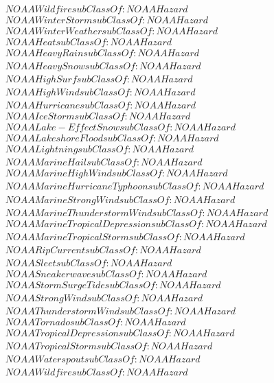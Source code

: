 \begin{align}
  NOAAWildfire subClassOf: NOAAHazard\\
  NOAAWinterStorm subClassOf: NOAAHazard\\
  NOAAWinterWeather subClassOf: NOAAHazard\\
  NOAAHeat subClassOf: NOAAHazard\\
  NOAAHeavyRain subClassOf: NOAAHazard\\
  NOAAHeavySnow subClassOf: NOAAHazard\\
  NOAAHighSurf subClassOf: NOAAHazard\\
  NOAAHighWind subClassOf: NOAAHazard\\
  NOAAHurricane subClassOf: NOAAHazard\\
  NOAAIceStorm subClassOf: NOAAHazard\\
  NOAALake-EffectSnow subClassOf: NOAAHazard\\
  NOAALakeshoreFlood subClassOf: NOAAHazard\\
  NOAALightning subClassOf: NOAAHazard\\
  NOAAMarineHail subClassOf: NOAAHazard\\
  NOAAMarineHighWind subClassOf: NOAAHazard\\
  NOAAMarineHurricaneTyphoon subClassOf: NOAAHazard\\
  NOAAMarineStrongWind subClassOf: NOAAHazard\\
  NOAAMarineThunderstormWind subClassOf: NOAAHazard\\
  NOAAMarineTropicalDepression subClassOf: NOAAHazard\\
  NOAAMarineTropicalStorm subClassOf: NOAAHazard\\
  NOAARipCurrent subClassOf: NOAAHazard\\
  NOAASleet subClassOf: NOAAHazard\\
  NOAASneakerwave subClassOf: NOAAHazard\\
  NOAAStormSurgeTide subClassOf: NOAAHazard\\
  NOAAStrongWind subClassOf: NOAAHazard\\
  NOAAThunderstormWind subClassOf: NOAAHazard\\
  NOAATornado subClassOf: NOAAHazard\\
  NOAATropicalDepression subClassOf: NOAAHazard\\
  NOAATropicalStorm subClassOf: NOAAHazard\\
  NOAAWaterspout subClassOf: NOAAHazard\\
  NOAAWildfire subClassOf: NOAAHazard\\

\end{align}

